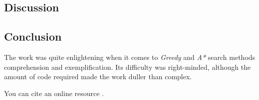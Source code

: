 \documentclass[journal,12pt,onecolumn,draftclsnofoot,]{IEEEtran}
\let\i\textit
\begin{document}
\subsection{Discussion}
\subsection{Conclusion}
The work was quite enlightening when it comes to \i{Greedy} and \i{A*} search methods comprehension and exemplification. Its difficulty was right-minded, although the amount of code required made the work duller than complex.





You can cite an online resource \cite{ford}.

\printbibliography


\vfill
\end{document}
